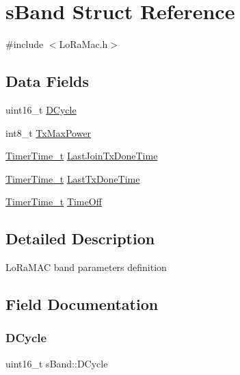 \hypertarget{structsBand}{}\section{s\+Band Struct Reference}
\label{structsBand}


{\ttfamily \#include $<$Lo\+Ra\+Mac.\+h$>$}

\subsection*{Data Fields}
\begin{DoxyCompactItemize}
\item 
uint16\+\_\+t \hyperlink{structsBand_a5a528104875e1e778028680434650b53}{D\+Cycle}
\item 
int8\+\_\+t \hyperlink{structsBand_abb03fade023a9d7fe2e4e7ade9ebc31a}{Tx\+Max\+Power}
\item 
\hyperlink{utilities_8h_a4215ca43d3e953099ea758ce428599d0}{Timer\+Time\+\_\+t} \hyperlink{structsBand_a82a8833c760fdd7052930c8ce585fee5}{Last\+Join\+Tx\+Done\+Time}
\item 
\hyperlink{utilities_8h_a4215ca43d3e953099ea758ce428599d0}{Timer\+Time\+\_\+t} \hyperlink{structsBand_a4c17433b9d28fd19439b5952faa1596c}{Last\+Tx\+Done\+Time}
\item 
\hyperlink{utilities_8h_a4215ca43d3e953099ea758ce428599d0}{Timer\+Time\+\_\+t} \hyperlink{structsBand_af2d2176d9685c6021363cf06ecbbe3fc}{Time\+Off}
\end{DoxyCompactItemize}


\subsection{Detailed Description}
Lo\+Ra\+M\+AC band parameters definition 

\subsection{Field Documentation}
\mbox{\label{structsBand_a5a528104875e1e778028680434650b53}} 
\subsubsection{\texorpdfstring{D\+Cycle}{DCycle}}
{\footnotesize\ttfamily uint16\+\_\+t s\+Band\+::\+D\+Cycle}

